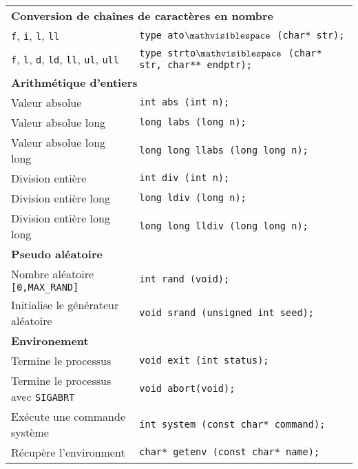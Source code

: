\documentclass{article}
\newcommand{\spc}{$\mathvisiblespace$}
\newcommand{\cd}{\lstinline}
\begin{document}
\begin{multicols*}{3}
\begin{tabularx}{\linewidth}{Xl}
  \multicolumn{2}{l}{\bf Conversion de chaînes de caractères en nombre} \\
  \cd{f}, \cd{i}, \cd{l}, \cd{ll} & \cd{type ato}\texttt{\spc}\cd{ (char* str);} \\
  \cd{f}, \cd{l}, \cd{d}, \cd{ld}, \cd{ll}, \cd{ul}, \cd{ull} & \cd{type strto}\texttt{\spc}\cd{ (char* str, char** endptr);} \\

  \multicolumn{2}{l}{\bf Arithmétique d'entiers} \rule{0pt}{3ex}\\
  Valeur absolue & \cd{int abs (int n);} \\
  Valeur absolue long & \cd{long labs (long n);} \\
  Valeur absolue long long & \cd{long long llabs (long long n);} \\
  Division entière & \cd{int div (int n);} \\
  Division entière long & \cd{long ldiv (long n);} \\
  Division entière long long & \cd{long long lldiv (long long n);} \\

  \multicolumn{2}{l}{\bf Pseudo aléatoire} \rule{0pt}{3ex}\\
  Nombre aléatoire \cd{[0,MAX_RAND]} & \cd{int rand (void);} \\
  Initialise le générateur aléatoire & \cd{void srand (unsigned int seed);} \\

  \multicolumn{2}{l}{\bf Environement} \rule{0pt}{3ex}\\
  Termine le processus & \cd{void exit (int status);} \\
  Termine le processus avec \cd{SIGABRT} & \cd{void abort(void);} \\
  Exécute une commande système & \cd{int system (const char* command);} \\
  Récupère l'environment & \cd{char* getenv (const char* name);} \\


\end{tabularx}
\end{multicols*}
\end{document}
